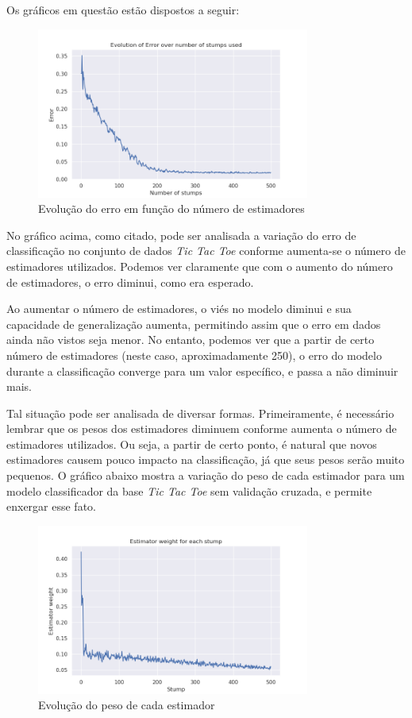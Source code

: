 \documentclass{article}
\begin{document}
Os gráficos em questão estão dispostos a seguir:

\begin{figure}[H]
    \centering
    \includegraphics[width=0.8\textwidth]{images/Error.png}
    \caption{Evolução do erro em função do número de estimadores}
\end{figure}

No gráfico acima, como citado, pode ser analisada a variação do erro de
classificação no conjunto de
dados \textit{Tic Tac Toe} conforme aumenta-se o número de estimadores
utilizados. Podemos ver claramente que
com o aumento do número de estimadores, o erro diminui, como era esperado.

Ao aumentar o número de estimadores, o viés no modelo diminui e sua capacidade
de generalização aumenta,
permitindo assim que o erro em dados ainda não vistos seja menor. No entanto,
podemos ver que a partir de certo número
de estimadores (neste caso, aproximadamente 250), o erro do modelo durante a
classificação converge
para um valor específico, e passa a não diminuir mais.

Tal situação pode ser analisada de diversar formas. Primeiramente, é necessário
lembrar que os pesos dos estimadores
diminuem conforme aumenta o número de estimadores utilizados. Ou seja, a partir
de certo ponto, é natural que
novos estimadores causem pouco impacto na classificação, já que seus pesos
serão muito pequenos. O gráfico abaixo
mostra a variação do peso de cada estimador para um modelo classificador da
base \textit{Tic Tac Toe} sem validação cruzada, e permite enxergar esse fato.

\begin{figure}[H]
    \centering
    \includegraphics[width=0.8\textwidth]{images/Estimatorweight.png}
    \caption{Evolução do peso de cada estimador}
\end{figure}
\end{document}
